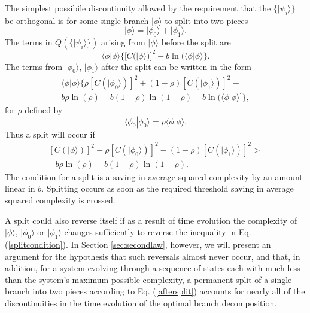 \documentclass[twocolumn,amsmath,amssymb]{revtex4-1}
\begin{document}
The simplest possibile discontinuity allowed by the requirement that the
$\{ |\psi_i \rangle  \}$ be orthogonal is for some single branch $|\phi \rangle $ to split
into two pieces
\begin{equation}\label{splitphi}
|\phi \rangle  = |\phi_0 \rangle  + |\phi_1 \rangle .
\end{equation}
The terms in $Q( \{|\psi_i \rangle \})$ arising from $|\phi \rangle $ before
the split are
\begin{equation}\label{beforesplit}
 \langle \phi|\phi \rangle \{[C( |\phi \rangle )]^2 - b \ln(  \langle  \phi | \phi \rangle \}.
\end{equation}
The terms from $|\phi_0 \rangle $, $|\phi_1 \rangle $ after the split can be written in the form
\begin{multline}\label{aftersplit}
 \langle \phi|\phi \rangle \{ \rho [C( |\phi_0 \rangle )]^2 + ( 1 - \rho) [C( |\phi_1 \rangle )]^2 - \\
b \rho \ln( \rho) - b ( 1 - \rho) \ln( 1 - \rho)  - b \ln(  \langle  \phi| \phi \rangle ]\},
\end{multline}
for $\rho$ defined by
\begin{equation}
    \label{defofrho}
     \langle  \phi_0 | \phi_0 \rangle  = \rho  \langle  \phi | \phi \rangle .
\end{equation}
Thus a split will occur if
\begin{multline}\label{splitcondition}
[C( |\phi \rangle )]^2 - \rho [C( |\phi_0 \rangle )]^2 - ( 1 - \rho) [C( |\phi_1 \rangle )]^2 > \\
-b \rho \ln( \rho) - b ( 1 - \rho) \ln( 1 - \rho).
\end{multline}
The condition for a split is a saving in average squared complexity
by an amount linear in $b$. 
Splitting occurs as soon as the required threshold 
saving in average squared complexity is crossed.

A split could also reverse itself if as a result of time evolution
the complexity of $|\phi \rangle $, $|\phi_0 \rangle $ or $|\phi_1 \rangle $ changes sufficiently to
reverse the inequality in Eq. (\ref{splitcondition}). 
In Section \ref{sec:secondlaw}, however, we will
present an argument for the hypothesis
that such reversals almost never occur, and that,
in addition, for a system evolving through
a sequence of states each with much less than the
system's maximum possible complexity,
a permanent split
of a single branch into two pieces according to
Eq. (\ref{aftersplit})
accounts for nearly all of the discontinuities
in the time evolution of 
the optimal branch decomposition.
\end{document}
